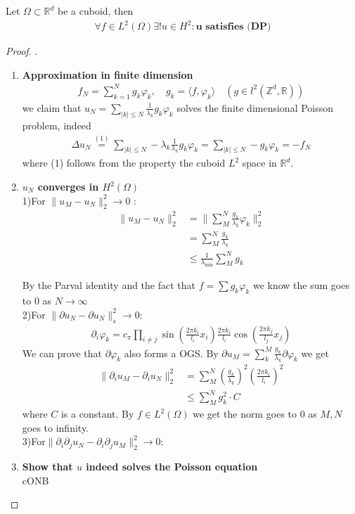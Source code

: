 \begin{theorem}
	Let $\Omega \subset \mathbb{R}^d$ be a cuboid, then
	\begin{align*}
		\forall f\in L^2(\Omega) \exists!u \in H^{2}: \textbf{u satisfies (DP)}
	\end{align*}
\end{theorem}
\begin{proof}.
\begin{enumerate}
	\item \textbf{Approximation in finite dimension}
	\begin{align*}
		f_N = \sum^N_{k = 1} g_k \varphi_k, \quad g_k = \langle f, \varphi_k \rangle \quad (g \in l^2(\mathbb{Z}^d, \mathbb{R}))
	\end{align*}
	we claim that $u_N = \sum_{|k| \leq N} \frac{1}{\lambda_k} g_k \varphi_k $ solves the finite dimensional Poisson problem, indeed
	\begin{align*}
		\Delta u_N \overset{(1)}{=} \sum_{|k| \leq N} -\lambda_k \frac{1}{\lambda_k} g_k \varphi_k = \sum_{|k| \leq N} -g_k \varphi_k = -f_N
	\end{align*}
	where (1) follows from the property the cuboid $L^2$ space in $\mathbb{R}^d$.
	\item \textbf{$u_N$ converges in $H^2(\Omega)$}\\
	1)For $\|u_M - u_N\|_2^2 \rightarrow 0$ :
	\begin{align*}
		\|u_M - u_N\|^2_2 &= \| \sum_M^N \frac{g_k}{\lambda_k}\varphi_k\|^2_2\\
		&= \sum_M^N \frac{g_k}{\lambda_k}\\
		&\leq \frac{1}{\lambda_{\min}} \sum_M^N g_k
	\end{align*}
	
	By the Parval identity and the fact that $f = \sum g_k \varphi_k$ we know the sum goes to 0 as $N\rightarrow \infty $ \\
	
	2)For $\|\partial u_N - \partial u_N\|^2_s \rightarrow 0$:
	\begin{align*}
		\partial_i \varphi_k = c_\pi \prod_{i \neq j} \sin(\frac{2\pi k_i}{l_i} x_i) \frac{2\pi k_i}{l_i} \cos (\frac{2\pi k_j }{l_j} x_j)
	\end{align*}
	We can prove that $\partial \varphi_k$ also forms a OGS. By $\partial u_M = \sum^M_k \frac{g_k}{\lambda_k} \partial \varphi_k $ we get
	\begin{align*}
		\|\partial_i u_M - \partial_i u_N\|^2_2 &= \sum_M^N (\frac{g_k}{\lambda_k})^2 (\frac{2\pi k_i}{l_i})^2\\
		&\leq \sum^N_M g_k^2 \cdot C
	\end{align*}
	where $C$ is a constant. By $f\in L^2(\Omega)$ we get the norm goes to 0 as $M, N$ goes to infinity.\\
	3)For$\|\partial_i \partial_j u_N - \partial_i \partial_j u_M\|^2_2 \rightarrow 0$:\\
	\item \textbf{Show that $u$ indeed solves the Poisson equation}\\
	cONB
\end{enumerate}
\end{proof}

